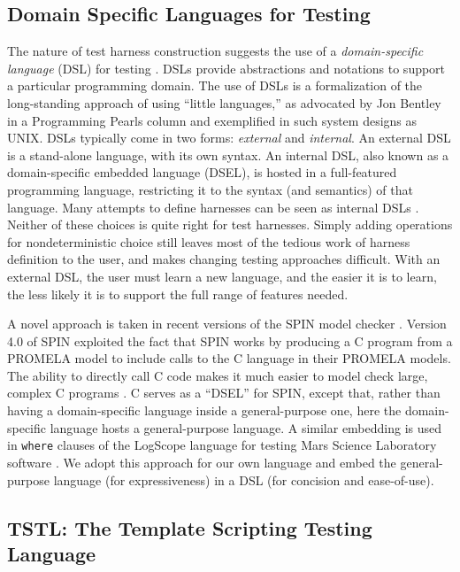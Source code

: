 \vspace{-0.2in}

\subsection{Domain Specific Languages for Testing}

The nature of test harness construction suggests the use of a
\emph{domain-specific language} (DSL) for testing \cite{ISOLA12}.  DSLs
\cite{Fow10} provide abstractions and notations to support a
particular programming domain. The use of DSLs is a formalization of
the long-standing approach of using ``little languages,'' as advocated by Jon Bentley in a
Programming Pearls column \cite{LitLang} and exemplified in such system
designs as UNIX.  DSLs typically come in two forms: \emph{external}
and \emph{internal}.  An external DSL is a stand-alone language, with
its own syntax.  An internal DSL, also known as a domain-specific
embedded language (DSEL), is hosted in a full-featured programming
language, restricting it to the syntax (and semantics) of that
language.  Many attempts to define harnesses can be seen as internal
DSLs \cite{UDITA,ISSRE12,JPF2,CBMCp,KLEE}.  Neither of these choices
is quite right for test harnesses.  Simply adding operations for
nondeterministic choice still leaves most of
the tedious work of harness definition to the user, and makes changing
testing approaches difficult.  With an external DSL, the user
must learn a new language, and the easier it is to learn, the less
likely it is to support the full range of features needed.

A novel approach is taken in recent versions of the SPIN model checker
\cite{SPIN}.  Version 4.0 of SPIN \cite{ModelDriven} exploited the
fact that SPIN works by producing a C program from a PROMELA model
to include calls to the C language in their PROMELA models.  The
ability to directly call C code makes it much easier to model check
large, complex C programs \cite{AMAI,ModelCode}.  C serves as a
``DSEL'' for SPIN, except that, rather than having a domain-specific
language inside a general-purpose one, here the domain-specific
language hosts a general-purpose language.  A similar embedding is
used in {\tt where} clauses of the LogScope language for testing Mars
Science Laboratory software \cite{scriptstospecs}.  We adopt this
approach for our own language and embed the general-purpose language (for expressiveness) in a
DSL (for concision and ease-of-use).

\subsection{TSTL: The Template Scripting Testing Language}

